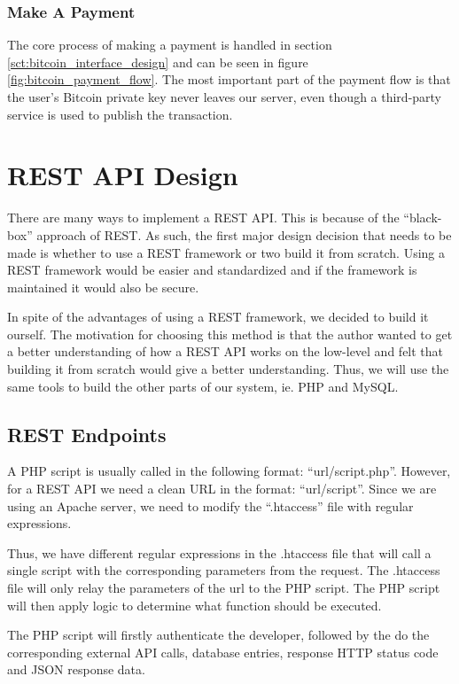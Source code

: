 \subsubsection{Make A Payment}

The core process of making a payment is handled in section \ref{sct:bitcoin_interface_design} and can be seen in figure \ref{fig:bitcoin_payment_flow}. The most important part of the payment flow is that the user's Bitcoin private key never leaves our server, even though a third-party service is used to publish the transaction. 


\section{REST API Design}

There are many ways to implement a REST API. This is because of the ``black-box'' approach of REST. As such, the first major design decision that needs to be made is whether to use a REST framework or two build it from scratch. Using a REST framework would be easier and standardized and if the framework is maintained it would also be secure.

In spite of the advantages of using a REST framework, we decided to build it ourself. The motivation for choosing this method is that the author wanted to get a better understanding of how a REST API works on the low-level and felt that building it from scratch would give a better understanding. Thus, we will use the same tools to build the other parts of our system, ie. PHP and MySQL.

\subsection{REST Endpoints}

A PHP script is usually called in the following format: ``url/script.php''. However, for a REST API we need a clean URL in the format: ``url/script''. Since we are using an Apache server, we need to modify the ``.htaccess'' file with regular expressions.

Thus, we have different regular expressions in the .htaccess file that will call a single script with the corresponding parameters from the request. The .htaccess file will only relay the parameters of the url to the PHP script. The PHP script will then apply logic to determine what function should be executed. 

The PHP script will firstly authenticate the developer, followed by the do the corresponding external API calls, database entries, response HTTP status code and JSON response data.

